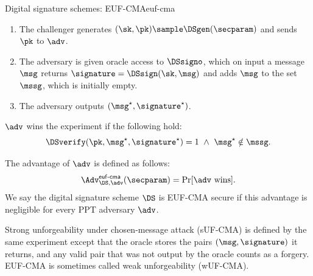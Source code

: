 \begin{experimentbox}{Digital signature schemes: EUF-CMA}{euf-cma}

  \begin{enumerate}

    \item The challenger generates $(\sk,\pk) \sample \DSgen(\secparam)$ and
sends $\pk$ to $\adv$.

    \item The adversary is given oracle access to $\DSsigno$, which on input a
message $\msg$ returns $\signature = \DSsign(\sk, \msg)$ and adds $\msg$ to
the set $\mssg$, which is initially empty.

    \item The adversary outputs $(\msg^\star, \signature^\star)$.

  \end{enumerate}

  $\adv$ wins the experiment if the following hold:
  \begin{equation*}
    \DSverify(\pk,\msg^\star,\signature^\star) = 1 \ \wedge\ \msg^\star \notin
\mssg.
  \end{equation*}

\end{experimentbox}

The advantage of $\adv$ is defined as follows:
%
\begin{equation*}
%
  \Adv^{\mathsf{euf\text{-}cma}}_{\DS, \adv}(\secparam) = \Pr[\adv\text{
wins}].
%
\end{equation*}
%
We say the digital signature scheme $\DS$ is EUF-CMA secure if this advantage is
negligible for every PPT adversary $\adv$.

Strong unforgeability under chosen-message attack (sUF-CMA) is defined by the
same experiment except that the oracle stores the pairs $(\msg, \signature)$ it
returns, and any valid pair that was not output by the oracle counts as a
forgery. EUF-CMA is sometimes called weak unforgeability (wUF-CMA).
